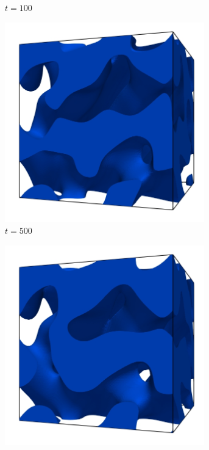 \begin{figure}[htb]
\begin{subfigure}[t]{0.45\textwidth}
        \caption{$t = 100$}
    \end{subfigure}
    \begin{subfigure}[t]{0.45\textwidth}
        \centering
        \includegraphics[width=0.95\textwidth]{Imagenes/Maxwell3D/Maxwell3D_sim/Imagenes/t_500}
        \caption{$t = 500$}
    \end{subfigure}    
    \begin{subfigure}[t]{0.45\textwidth}
        \centering
        \includegraphics[width=0.95\textwidth]{Imagenes/Maxwell3D/Maxwell3D_sim/Imagenes/t_1000}

\end{subfigure}
\end{figure}
